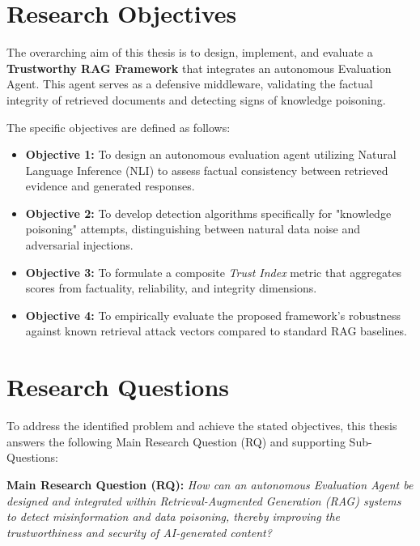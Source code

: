 \section{Research Objectives}
\label{sec:objectives}

The overarching aim of this thesis is to design, implement, and evaluate a \textbf{Trustworthy RAG Framework} that integrates an autonomous Evaluation Agent. This agent serves as a defensive middleware, validating the factual integrity of retrieved documents and detecting signs of knowledge poisoning.

The specific objectives are defined as follows:

\begin{itemize}
    \item \textbf{Objective 1:} To design an autonomous evaluation agent utilizing Natural Language Inference (NLI) to assess factual consistency between retrieved evidence and generated responses.
    \item \textbf{Objective 2:} To develop detection algorithms specifically for "knowledge poisoning" attempts, distinguishing between natural data noise and adversarial injections.
    \item \textbf{Objective 3:} To formulate a composite \textit{Trust Index} metric that aggregates scores from factuality, reliability, and integrity dimensions.
    \item \textbf{Objective 4:} To empirically evaluate the proposed framework’s robustness against known retrieval attack vectors compared to standard RAG baselines.
\end{itemize}

\section{Research Questions}
\label{sec:research_questions}

To address the identified problem and achieve the stated objectives, this thesis answers the following Main Research Question (RQ) and supporting Sub-Questions:

\textbf{Main Research Question (RQ):}
\textit{How can an autonomous Evaluation Agent be designed and integrated within Retrieval-Augmented Generation (RAG) systems to detect misinformation and data poisoning, thereby improving the trustworthiness and security of AI-generated content?}

